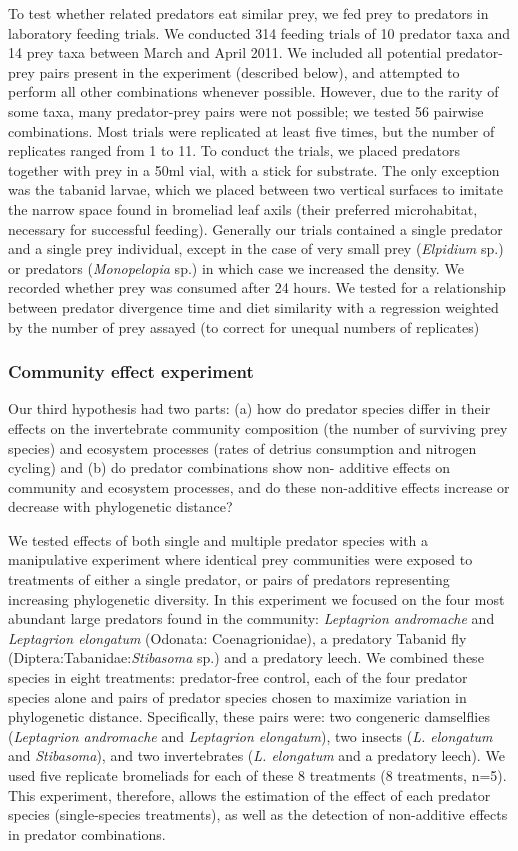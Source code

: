 \documentclass[11pt]{article}
\begin{document}
To test whether related predators eat similar prey, we fed prey to
predators in laboratory feeding trials. We conducted 314 feeding trials
of 10 predator taxa and 14 prey taxa between March and April 2011. We
included all potential predator-prey pairs present in the experiment
(described below), and attempted to perform all other combinations
whenever possible. However, due to the rarity of some taxa, many
predator-prey pairs were not possible; we tested 56 pairwise
combinations. Most trials were replicated at least five times, but the
number of replicates ranged from 1 to 11. To conduct the trials, we
placed predators together with prey in a 50ml vial, with a stick for
substrate. The only exception was the tabanid larvae, which we placed
between two vertical surfaces to imitate the narrow space found in
bromeliad leaf axils (their preferred microhabitat, necessary for
successful feeding). Generally our trials contained a single predator
and a single prey individual, except in the case of very small prey
(\emph{Elpidium} sp.) or predators (\emph{Monopelopia} sp.) in which
case we increased the density. We recorded whether prey was consumed
after 24 hours. We tested for a relationship between predator divergence time and diet similarity with a regression weighted by the number of prey assayed (to correct for unequal numbers of replicates)

\subsubsection*{Community effect experiment}

Our third hypothesis had two parts: (a) how do predator species differ
in their effects on the invertebrate community composition (the number of surviving prey species) and ecosystem processes (rates of detrius consumption and nitrogen cycling)
and (b) do predator combinations show non- additive effects on community
and ecosystem processes, and do these non-additive effects increase or
decrease with phylogenetic distance?

We tested effects of both single and multiple predator species with a manipulative experiment where identical prey
communities were exposed to treatments of either a single predator, or
pairs of predators representing increasing phylogenetic diversity. In
this experiment we focused on the four most abundant large predators
found in the community: \emph{Leptagrion andromache} and
\emph{Leptagrion elongatum} (Odonata: Coenagrionidae), a predatory
Tabanid fly (Diptera:Tabanidae:\emph{Stibasoma} sp.) and a predatory
leech. We combined these species in eight treatments: predator-free
control, each of the four predator species alone and
pairs of predator species chosen to maximize variation in phylogenetic
distance. Specifically, these pairs were: two congeneric
damselflies (\emph{Leptagrion andromache} and \emph{Leptagrion
elongatum}), two insects (\emph{L. elongatum} and \emph{Stibasoma}), and
two invertebrates (\emph{L. elongatum} and a predatory leech). We used
five replicate bromeliads for each of these 8 treatments (8 treatments,
n=5). This experiment, therefore, allows the estimation of the effect of
each predator species (single-species treatments), as well as the
detection of non-additive effects in predator combinations.
\end{document}
